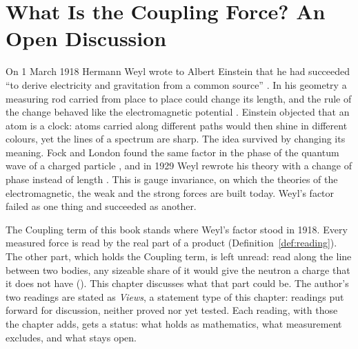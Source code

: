 \makeatletter
{}
\makeatother
\providecommand{\Com}{\operatorname{Com}}
\providecommand{\Sh}{\operatorname{Sh}}
\chapter{What Is the Coupling Force? An Open Discussion}\label{ch:open}



On 1 March 1918 Hermann Weyl wrote to Albert Einstein that he had succeeded \enquote{to derive electricity and gravitation from a common source} \citep{ORaifeartaighStraumann2000}. In his geometry a measuring rod carried from place to place could change its length, and the rule of the change behaved like the electromagnetic potential \citep{Weyl1918}. Einstein objected that an atom is a clock: atoms carried along different paths would then shine in different colours, yet the lines of a spectrum are sharp. The idea survived by changing its meaning. Fock and London found the same factor in the phase of the quantum wave of a charged particle \citep{Fock1926,London1927}, and in 1929 Weyl rewrote his theory with a change of phase instead of length \citep{Weyl1929,Weyl1929PNAS,JacksonOkun2001}. This is gauge invariance, on which the theories of the electromagnetic, the weak and the strong forces are built today. Weyl's factor failed as one thing and succeeded as another.

\bigskip

The Coupling term of this book stands where Weyl's factor stood in 1918. Every measured force is read by the real part of a product (Definition~\ref{def:reading}). The other part, which holds the Coupling term, is left unread: read along the line between two bodies, any sizeable share of it would give the neutron a charge that it does not have (). This chapter discusses what that part could be. The author's two readings are stated as \emph{Views}, a statement type of this chapter: readings put forward for discussion, neither proved nor yet tested. Each reading, with those the chapter adds, gets a status: what holds as mathematics, what measurement excludes, and what stays open.


